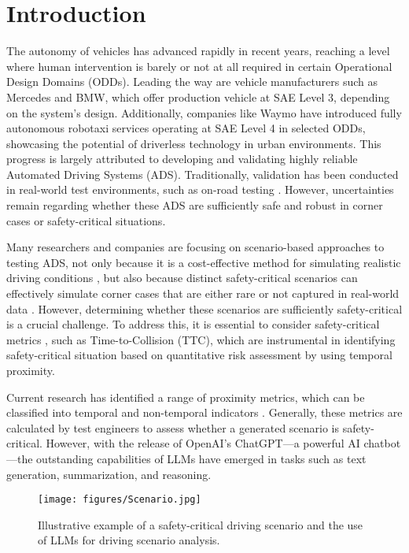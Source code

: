 
\section{Introduction}
\label{sec:introduction}
The autonomy of vehicles has advanced rapidly in recent years, reaching a level where human intervention is barely or not at all required in certain Operational Design Domains (ODDs). Leading the way are vehicle manufacturers such as Mercedes and BMW, which offer production vehicle at SAE Level 3, depending on the system's design. Additionally, companies like Waymo have introduced fully autonomous robotaxi services operating at SAE Level 4 in selected ODDs, showcasing the potential of driverless technology in urban environments. This progress is largely attributed to developing and validating highly reliable Automated Driving Systems (ADS). Traditionally, validation has been conducted in real-world test environments, such as on-road testing \cite{khan2023safety}. However, uncertainties remain regarding whether these ADS are sufficiently safe and robust in corner cases or safety-critical situations\cite{ding2023survey}.

Many researchers and companies are focusing on scenario-based approaches to testing ADS, not only because it is a cost-effective method for simulating realistic driving conditions \cite{riedmaier2020survey}, but also because distinct safety-critical scenarios can effectively simulate corner cases that are either rare or not captured in real-world data \cite{menzel2018scenarios}. However, determining whether these scenarios are sufficiently safety-critical is a crucial challenge. To address this, it is essential to consider safety-critical metrics \cite{vogel2003comparison}, such as Time-to-Collision (TTC), which are instrumental in identifying safety-critical situation based on quantitative risk assessment by using temporal proximity.

Current research has identified a range of proximity metrics, which can be classified into temporal and non-temporal indicators \cite{mahmud2017application}. 
Generally, these metrics are calculated by test engineers to assess whether a generated scenario is safety-critical. However, with the release of OpenAI's ChatGPT---a powerful AI chatbot---the outstanding capabilities of LLMs have emerged in tasks such as text generation, summarization, and reasoning.
\begin{figure}[ht]
    \centering
    \texttt{[image: figures/Scenario.jpg]} 
    \caption{Illustrative example of a safety-critical driving scenario and the use of LLMs for driving scenario analysis.}
    \label{fig:scenario} %
\end{figure}

